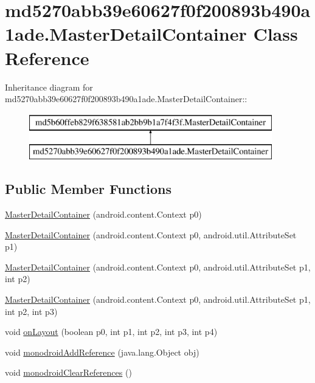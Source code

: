 \hypertarget{classmd5270abb39e60627f0f200893b490a1ade_1_1_master_detail_container}{
\section{md5270abb39e60627f0f200893b490a1ade.MasterDetailContainer Class Reference}
\label{classmd5270abb39e60627f0f200893b490a1ade_1_1_master_detail_container}
}
Inheritance diagram for md5270abb39e60627f0f200893b490a1ade.MasterDetailContainer::\begin{figure}[H]
\begin{center}
\leavevmode
\includegraphics[height=2cm]{classmd5270abb39e60627f0f200893b490a1ade_1_1_master_detail_container}
\end{center}
\end{figure}
\subsection*{Public Member Functions}
\begin{CompactItemize}
\item 
\hyperlink{classmd5270abb39e60627f0f200893b490a1ade_1_1_master_detail_container_9807f2073f88d818e7daa1d67838ea41}{MasterDetailContainer} (android.content.Context p0)
\item 
\hyperlink{classmd5270abb39e60627f0f200893b490a1ade_1_1_master_detail_container_c1707155566739333160760c52523d93}{MasterDetailContainer} (android.content.Context p0, android.util.AttributeSet p1)
\item 
\hyperlink{classmd5270abb39e60627f0f200893b490a1ade_1_1_master_detail_container_fe89442bed68567e1df7fa008310532a}{MasterDetailContainer} (android.content.Context p0, android.util.AttributeSet p1, int p2)
\item 
\hyperlink{classmd5270abb39e60627f0f200893b490a1ade_1_1_master_detail_container_003d434348891f8f2e731962b72dd90a}{MasterDetailContainer} (android.content.Context p0, android.util.AttributeSet p1, int p2, int p3)
\item 
void \hyperlink{classmd5270abb39e60627f0f200893b490a1ade_1_1_master_detail_container_f60c6a5b4b46f56b41eb0cd825f110de}{onLayout} (boolean p0, int p1, int p2, int p3, int p4)
\item 
void \hyperlink{classmd5270abb39e60627f0f200893b490a1ade_1_1_master_detail_container_31845d67e73cb6060fb8228c0a40c8d4}{monodroidAddReference} (java.lang.Object obj)
\item 
void \hyperlink{classmd5270abb39e60627f0f200893b490a1ade_1_1_master_detail_container_93a5d443fda3e43f134d2522b7230b21}{monodroidClearReferences} ()
\end{CompactItemize}
